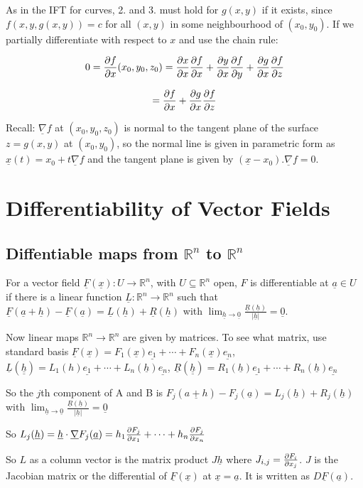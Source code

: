 As in the IFT for curves, 2. and 3. must hold for $g(x, y)$ if it exists, since $f(x, y, g(x, y)) = c$ for all $(x, y)$ in some neighbourhood of $(x_0, y_0)$. If we partially differentiate with respect to $x$ and use the chain rule:

\[0 = \diffp{f}{x} (x_0, y_0, z_0) = \diffp{x}{x} \diffp{f}{x} + \diffp{y}{x}\diffp{f}{y} + \diffp{g}{x}\diffp{f}{z}\]

\[= \diffp{f}{x} + \diffp{g}{x}\diffp{f}{z}\]

Recall: $\underline{\nabla} f$ at $(x_0, y_0, z_0)$ is normal to the tangent plane of the surface $z = g(x, y)$ at $(x_0, y_0)$, so the normal line is given in parametric form as $\underline{x}(t) = x_0 + t \underline{\nabla} f$ and the tangent plane is given by $(\underline{x} - x_0) . \underline{\nabla} f = 0$.

\section{Differentiability of Vector Fields}

\subsection{Diffentiable maps from $\mathbb{R}^n$ to $\mathbb{R}^n$}

\begin{definition}
	For a vector field $\underline{F}(\underline{x}): U \rightarrow \mathbb{R}^n$, with $U \subseteq \mathbb{R}^n$ open, $F$ is differentiable at $\underline{a} \in U$ if there is a linear function $\underline{L}: \mathbb{R}^n \rightarrow \mathbb{R}^n$ such that $\underline{F}(\underline{a} + \underline{h}) - \underline{F}(\underline{a}) = \underline{L}(\underline{h}) + \underline{R}(\underline{h})$ with $\lim_{\underline{h} \rightarrow \underline{0}} \frac{\underline{R}(\underline{h})}{|\underline{h}|} = \underline{0}$.

	Now linear maps $\mathbb{R}^n \rightarrow \mathbb{R}^n$ are given by matrices. To see what matrix, use standard basis $\underline{F}(\underline{x}) = F_1(\underline{x}) \underline{e_1} + \cdots + F_n(\underline{x}) \underline{e_n}$, $\underline{L}(\underline{\underline{h}}) = L_1(h) \underline{e_1} + \cdots + L_n(\underline{h}) \underline{e_n}$, $\underline{R}(\underline{\underline{h}}) = R_1(\underline{h}) \underline{e_1} + \cdots + R_n(\underline{h}) \underline{e_n}$

	So the $j$th component of A and B is $F_j(\underline{a + h}) - F_j(\underline{a}) = L_j(\underline{h}) + R_j(\underline{h})$ with $\lim_{\underline{h} \rightarrow \underline{0}} \frac{\underline{R}(\underline{h})}{|\underline{h}|} = \underline{0}$

	So $L_j(\underline{h}) = \underline{h} \cdot \underline{\nabla} F_j(\underline{a}) = h_1 \diffp{F_j}{x_1} + \cdots + h_n \diffp{F_j}{x_n}$

	So $L$ as a column vector is the matrix product $J \underline{h}$ where $J_{i, j} = \diffp{F_i}{x_j}$. $J$ is the Jacobian matrix or the differential of $\underline{F}(\underline{x})$ at $\underline{x} = \underline{a}$. It is written as $D\underline{F}(\underline{a})$.
\end{definition}

